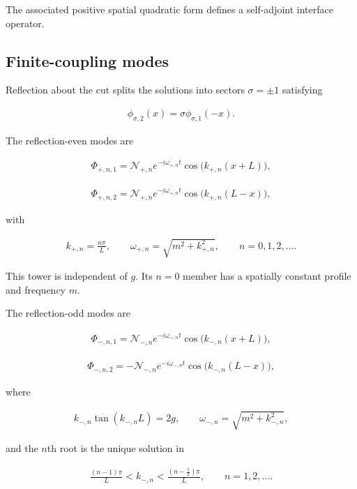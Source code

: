 The associated positive spatial quadratic form defines a self-adjoint interface operator.

\subsection{Finite-coupling modes}\label{subsec:interval-modes}

Reflection about the cut splits the solutions into sectors $\sigma=\pm1$ satisfying

\begin{align}
\phi_{\sigma,2}(x)=\sigma\phi_{\sigma,1}(-x).
\end{align}

The reflection-even modes are

\begin{align}
\Phi_{+,n,1}
=\mathcal N_{+,n}e^{-i\omega_{+,n}t}
\cos\bigl(k_{+,n}(x+L)\bigr),
\end{align}

\begin{align}
\Phi_{+,n,2}
=\mathcal N_{+,n}e^{-i\omega_{+,n}t}
\cos\bigl(k_{+,n}(L-x)\bigr),
\end{align}

with

\begin{align}
k_{+,n}=\frac{n\pi}{L},
\qquad
\omega_{+,n}=\sqrt{m^2+k_{+,n}^2},
\qquad
n=0,1,2,\ldots.
\end{align}

This tower is independent of $g$. Its $n=0$ member has a spatially constant profile and frequency $m$.

The reflection-odd modes are

\begin{align}
\Phi_{-,n,1}
=\mathcal N_{-,n}e^{-i\omega_{-,n}t}
\cos\bigl(k_{-,n}(x+L)\bigr),
\end{align}

\begin{align}
\Phi_{-,n,2}
=-\mathcal N_{-,n}e^{-i\omega_{-,n}t}
\cos\bigl(k_{-,n}(L-x)\bigr),
\end{align}

where

\begin{align}
k_{-,n}\tan(k_{-,n}L)=2g,
\qquad
\omega_{-,n}=\sqrt{m^2+k_{-,n}^2},
\end{align}

and the $n$th root is the unique solution in

\begin{align}
\frac{(n-1)\pi}{L}<k_{-,n}<\frac{(n-\frac12)\pi}{L},
\qquad
n=1,2,\ldots.
\end{align}

